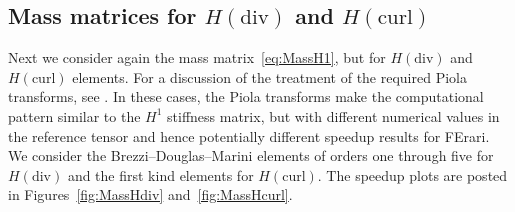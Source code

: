 \subsection{Mass matrices for $H(\mathrm{div})$ and $H(\mathrm{curl})$}

Next we consider again the mass matrix~\eqref{eq:MassH1}, but for $
H(\mathrm{div})$ and $H(\mathrm{curl})$ elements. For a discussion of
the treatment of the required Piola transforms,
see \citet{RognesKirbyLogg2009}. In these cases, the Piola transforms
make the computational pattern similar to the $ H^1 $ stiffness
matrix, but with different numerical values in the reference tensor
and hence potentially different speedup results for FErari. We
consider the Brezzi--Douglas--Marini elements of orders one through
five for $H(\mathrm{div})$ and the first kind \nedelec{} elements
for $H(\mathrm{curl}) $. The speedup plots are posted in
Figures~\ref{fig:MassHdiv} and~\ref{fig:MassHcurl}.

